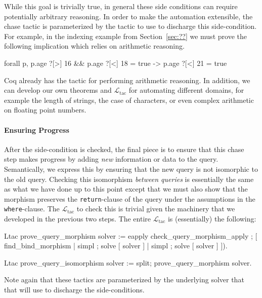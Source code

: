 \documentclass[preprint]{sigplanconf}
\newcommand{\WHERE}{{\tt where} \ }
\newcommand{\RETURN}{{\tt return} \ }
\newcommand{\ltac}[0]{\ensuremath{\mathcal{L}_{\mathrm{tac}}}}
\begin{document}
While this goal is trivially true, in general these side conditions can require potentially arbitrary reasoning.
In order to make the automation extensible, the chase tactic is parameterized by the tactic to use to discharge this side-condition.
For example, in the indexing example from Section~\ref{sec:??} we must prove the following implication which relies on arithmetic reasoning.
\begin{coq}
forall p, p.age ?[>] 16 && p.age ?[<] 18 = true ->
          p.age ?[<] 21 = true
\end{coq}
Coq already has the  tactic for performing arithmetic reasoning.
In addition, we can develop our own theorems and \ltac{} for automating different domains, for example the length of strings, the case of characters, or even complex arithmetic on floating point numbers.

\paragraph{Ensuring Progress}
After the side-condition is checked, the final piece is to ensure that this chase step makes progress by adding \emph{new} information or data to the query.
Semantically, we express this by ensuring that the new query is not isomorphic to the old query.
Checking this isomorphism \emph{between queries} is essentially the same as what we have done up to this point except that we must also show that the morphism preserves the {\tt return}-clause of the query under the assumptions in the {\tt where}-clause.
The \ltac{} to check this is trivial given the machinery that we developed in the previous two steps.
The entire \ltac{} is (essentially) the following:
\begin{coq}
Ltac prove_query_morphism solver :=
  eapply check_query_morphism_apply ;
    [ find_bind_morphism
    | simpl ; solve [ solver ]
    | simpl ; solve [ solver ] ]).

Ltac prove_query_isomorphism solver :=
  split; prove_query_morphism solver.
\end{coq}
Note again that these tactics are parameterized by the underlying solver that that will use to discharge the side-conditions.
\end{document}

